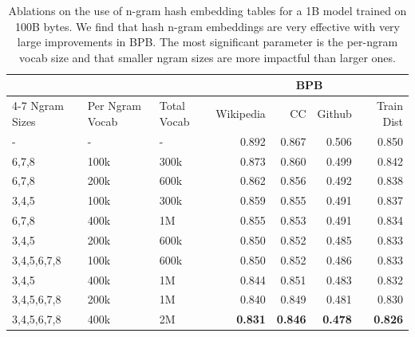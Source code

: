 \begin{table}[th]
\centering
\begin{tabular}{@{}lllrrrr@{}}
\toprule
 & & &  \multicolumn{4}{c}{BPB} \\
\cmidrule(lr){4-7} 
Ngram Sizes & Per Ngram Vocab & Total Vocab &  Wikipedia &    CC &  Github &  Train Dist \\
\midrule
               - &       - &        - &    0.892 & 0.867 &   0.506 &       0.850 \\
           6,7,8 &      100k &   300k &    0.873 & 0.860 &   0.499 &       0.842 \\
           6,7,8 &      200k &   600k &    0.862 & 0.856 &   0.492 &       0.838 \\
           3,4,5 &      100k &   300k &    0.859 & 0.855 &   0.491 &       0.837 \\
           6,7,8 &      400k &     1M &    0.855 & 0.853 &   0.491 &       0.834 \\
           3,4,5 &      200k &   600k &    0.850 & 0.852 &   0.485 &       0.833 \\
     3,4,5,6,7,8 &      100k &   600k &    0.850 & 0.852 &   0.486 &       0.833 \\
           3,4,5 &      400k &     1M &    0.844 & 0.851 &   0.483 &       0.832 \\
     3,4,5,6,7,8 &      200k &     1M &    0.840 & 0.849 &   0.481 &       0.830 \\
     3,4,5,6,7,8 &      400k &     2M &    \textbf{0.831} & \textbf{0.846} &   \textbf{0.478} &       \textbf{0.826} \\
\bottomrule
\end{tabular}
\caption{Ablations on the use of n-gram hash embedding tables for a 1B \model{} model trained on 100B bytes. We find that hash n-gram embeddings are very effective with very large improvements in BPB.
The most significant parameter is the per-ngram vocab size and that smaller ngram sizes are more impactful than larger ones.
}
\label{tab:ngram_ablations_1b}
\end{table}